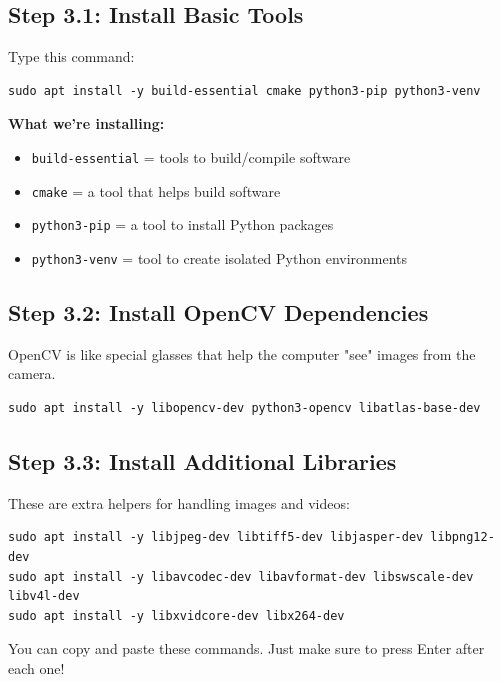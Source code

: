 \documentclass[12pt,a4paper]{article}
\begin{document}
\subsection{Step 3.1: Install Basic Tools}

Type this command:

\begin{lstlisting}
sudo apt install -y build-essential cmake python3-pip python3-venv
\end{lstlisting}

\begin{infobox}
\textbf{What we're installing:}
\begin{itemize}
    \item \texttt{build-essential} = tools to build/compile software
    \item \texttt{cmake} = a tool that helps build software
    \item \texttt{python3-pip} = a tool to install Python packages
    \item \texttt{python3-venv} = tool to create isolated Python environments
\end{itemize}
\end{infobox}

\subsection{Step 3.2: Install OpenCV Dependencies}

OpenCV is like special glasses that help the computer "see" images from the camera.

\begin{lstlisting}
sudo apt install -y libopencv-dev python3-opencv libatlas-base-dev
\end{lstlisting}

\subsection{Step 3.3: Install Additional Libraries}

These are extra helpers for handling images and videos:

\begin{lstlisting}
sudo apt install -y libjpeg-dev libtiff5-dev libjasper-dev libpng12-dev
sudo apt install -y libavcodec-dev libavformat-dev libswscale-dev libv4l-dev
sudo apt install -y libxvidcore-dev libx264-dev
\end{lstlisting}

\begin{tipbox}
You can copy and paste these commands. Just make sure to press Enter after each one!
\end{tipbox}
\end{document}

